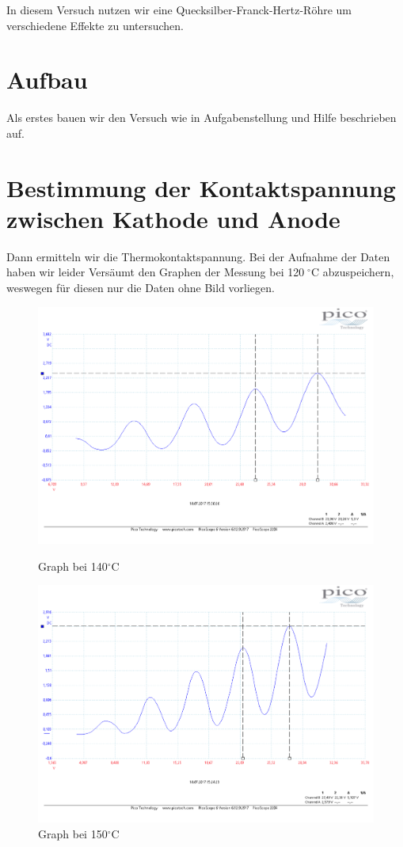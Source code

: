 In diesem Versuch nutzen wir eine Quecksilber-Franck-Hertz-Röhre um verschiedene Effekte zu untersuchen.
\section{Aufbau}
Als erstes bauen wir den Versuch wie in Aufgabenstellung und Hilfe beschrieben auf.
\section{Bestimmung der Kontaktspannung zwischen Kathode und Anode}
Dann ermitteln wir die Thermokontaktspannung. Bei der Aufnahme der Daten haben wir leider Versäumt den Graphen der Messung bei 120$\; ^\circ $C abzuspeichern, weswegen für diesen nur die Daten ohne Bild vorliegen.
\begin{figure}
	\centering
	\includegraphics[width=\textwidth]{../Daten/Aufgabe1/Frank_Hertz_140.pdf}
	\caption{Graph bei 140$ ^\circ $C}
	\includegraphics[width=\textwidth]{../Daten/Aufgabe1/Frank_Hertz_150.pdf}
	\caption{Graph bei 150$ ^\circ $C}
\end{figure}

